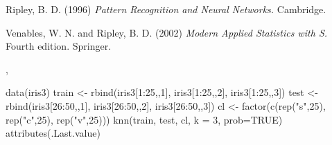 \begin{References}\relax
Ripley, B. D. (1996)
\emph{Pattern Recognition and Neural Networks.} Cambridge.

Venables, W. N. and Ripley, B. D. (2002)
\emph{Modern Applied Statistics with S.} Fourth edition.  Springer.
\end{References}
\begin{SeeAlso}\relax
{}, 
\end{SeeAlso}
\begin{Examples}
\begin{ExampleCode}
data(iris3)
train <- rbind(iris3[1:25,,1], iris3[1:25,,2], iris3[1:25,,3])
test <- rbind(iris3[26:50,,1], iris3[26:50,,2], iris3[26:50,,3])
cl <- factor(c(rep("s",25), rep("c",25), rep("v",25)))
knn(train, test, cl, k = 3, prob=TRUE)
attributes(.Last.value)
\end{ExampleCode}
\end{Examples}

